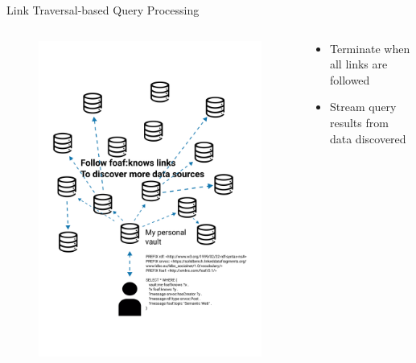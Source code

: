 \begin{frame}{Link Traversal-based Query Processing}
    \begin{columns}[T] %
        \begin{column}{.48\textwidth} 
            \begin{figure}
                \centering
                \includegraphics[height = .80\textheight]{figures/queryWithLinkTraversal3}
            \end{figure}
        \end{column}%
        \hfill%
        \begin{column}{.48\textwidth}
            \bigskip
            \begin{itemize}
                \item Terminate when all links are followed
                \item Stream query results from data discovered
            \end{itemize}
        \end{column}%
    \end{columns}
\end{frame}

